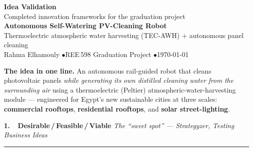 \documentclass[11pt]{article}
\newcommand{\framehead}[2]{%
  \par\vspace{6pt}%
  {\color{slideblue}\large\bfseries #1}%
  \hfill{\color{inkgrey}\small\itshape #2}\par
  {\color{slideblue}\rule{\linewidth}{1.2pt}}\par\vspace{2pt}}
\begin{document}
\pagestyle{empty}

\begin{center}
  {\color{slideblue}\Huge\bfseries Idea Validation}\\[4pt]
  {\color{inkgrey}\large Completed innovation frameworks for the graduation project}\\[8pt]
  {\large\bfseries Autonomous Self-Watering PV-Cleaning Robot}\\[2pt]
  {\color{inkgrey} Thermoelectric atmospheric water harvesting (TEC-AWH) + autonomous panel cleaning}\\[6pt]
  {\small Rahma Elhamouly \quad$\bullet$\quad REE\,598 Graduation Project \quad$\bullet$\quad \today}
\end{center}

\noindent\colorbox{panelgrey}{\parbox{\dimexpr\linewidth-2\fboxsep}{%
\small\textbf{The idea in one line.} An autonomous rail-guided robot that cleans
photovoltaic panels \emph{while generating its own distilled cleaning water from the
surrounding air} using a thermoelectric (Peltier) atmospheric-water-harvesting module ---
engineered for Egypt's new sustainable cities at three scales: \textbf{commercial
rooftops}, \textbf{residential rooftops}, and \textbf{solar street-lighting}.}}

\framehead{1.\ \ Desirable\,/\,Feasible\,/\,Viable}{The ``sweet spot'' --- Strategyzer, \emph{Testing Business Ideas}}

\begin{center}
\end{center}
\end{document}
